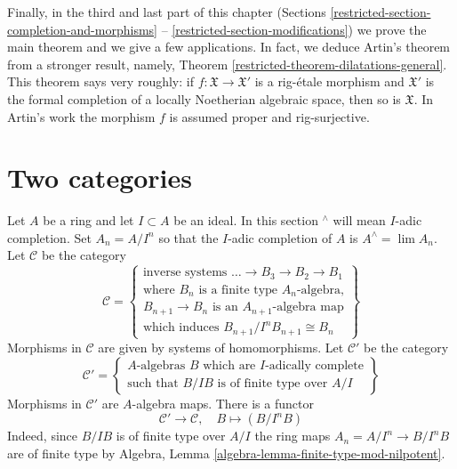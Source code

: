 \medskip\noindent
Finally, in the third and last part of this chapter
(Sections \ref{restricted-section-completion-and-morphisms} --
\ref{restricted-section-modifications}) we prove the main theorem and
we give a few applications.
In fact, we deduce Artin's theorem from a stronger
result, namely, Theorem \ref{restricted-theorem-dilatations-general}.
This theorem says very roughly: if $f : \mathfrak X \to \mathfrak X'$
is a rig-\'etale morphism and $\mathfrak X'$ is the formal
completion of a locally Noetherian algebraic space, then so
is $\mathfrak X$. In Artin's work the morphism $f$ is assumed proper
and rig-surjective.

\section{Two categories}
\label{restricted-section-two-categories}
Let $A$ be a ring and let $I \subset A$ be an ideal.
In this section ${}^\wedge$ will mean $I$-adic completion.
Set $A_n = A/I^n$ so that the $I$-adic completion of $A$ is
$A^\wedge = \lim A_n$. Let $\mathcal{C}$ be the
category
\begin{equation}
\label{equation-C}
\mathcal{C} =
\left\{
\begin{matrix}
\text{inverse systems }\ldots \to B_3 \to B_2 \to B_1 \\
\text{where }B_n\text{ is a finite type }A_n\text{-algebra,}\\
B_{n + 1} \to B_n\text{ is an }A_{n + 1}\text{-algebra map}\\
\text{which induces }B_{n + 1}/I^nB_{n + 1} \cong B_n
\end{matrix}
\right\}
\end{equation}
Morphisms in $\mathcal{C}$ are given by systems of homomorphisms.
Let $\mathcal{C}'$ be the category
\begin{equation}
\label{equation-C-prime}
\mathcal{C}' =
\left\{
\begin{matrix}
A\text{-algebras }B\text{ which are }I\text{-adically complete}\\
\text{such that }B/IB\text{ is of finite type over }A/I
\end{matrix}
\right\}
\end{equation}
Morphisms in $\mathcal{C}'$ are $A$-algebra maps. There is a functor
\begin{equation}
\label{equation-from-complete-to-systems}
\mathcal{C}' \longrightarrow \mathcal{C},\quad
B \longmapsto (B/I^nB)
\end{equation}
Indeed, since $B/IB$ is of finite type over $A/I$ the ring maps
$A_n = A/I^n \to B/I^nB$ are of finite type by
Algebra, Lemma \ref{algebra-lemma-finite-type-mod-nilpotent}.

